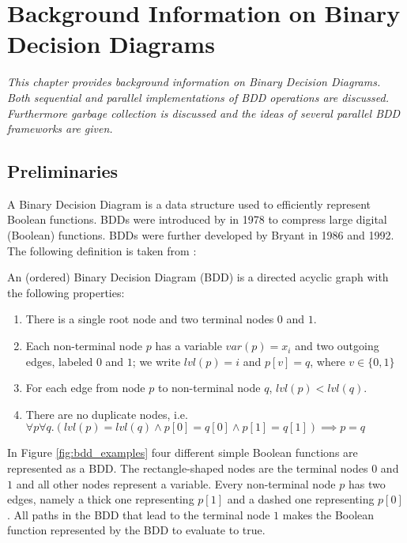 \chapter{Background Information on Binary Decision Diagrams}

\textit{This chapter provides background information on Binary Decision Diagrams. Both sequential and parallel implementations of BDD operations are discussed. Furthermore garbage collection is discussed and the ideas of several parallel BDD frameworks are given. }

\section{Preliminaries}
A Binary Decision Diagram is a data structure used to efficiently represent Boolean functions. BDDs were introduced by \cite{akers1978binary} in 1978 to compress large digital (Boolean) functions. BDDs were further developed by Bryant \cite{bryant1986graph, bryant1992symbolic} in 1986 and 1992. The following definition is taken from \cite{sylvan_multicore_bdd}:

\begin{definition}
	An (ordered) Binary Decision Diagram (BDD) is a directed acyclic graph with the following properties:
	\begin{enumerate}
		\item There is a single root node and two terminal nodes $0$ and $1$.
		\item Each non-terminal node $p$ has a variable $var(p) = x_i$ and two outgoing edges, labeled $0$ and $1$; we write $lvl(p) = i$ and $p[v] = q$, where $v \in \{ 0, 1 \}$
		\item For each edge from node $p$ to non-terminal node $q$, $lvl(p) < lvl(q)$.
		\item There are no duplicate nodes, i.e. $\forall p \forall q .(lvl(p) = lvl(q) \wedge p[0] = q[0] \wedge p[1] = q[1]) \implies p = q$
	\end{enumerate}
\end{definition}

In Figure \ref{fig:bdd_examples} four different simple Boolean functions are represented as a BDD. The rectangle-shaped nodes are the terminal nodes $0$ and $1$ and all other nodes represent a variable. Every non-terminal node $p$ has two edges, namely a thick one representing $p[1]$ and a dashed one representing $p[0]$. All paths in the BDD that lead to the terminal node $1$ makes the Boolean function represented by the BDD to evaluate to true.

